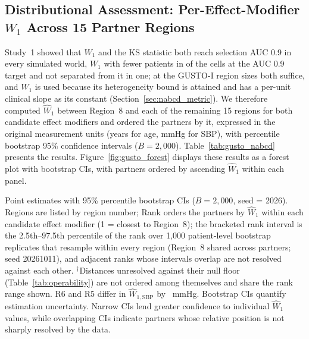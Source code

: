 \documentclass[AMA,Times1COL]{WileyNJDv5}
\begin{document}
\subsection{Distributional Assessment: Per-Effect-Modifier $W_1$ Across 15 Partner Regions}\label{sec:app_nabcd}

Study~1 showed that $W_1$ and the KS statistic both reach selection AUC 0.9 in every simulated world, $W_1$ with fewer patients in  of the  cells at the AUC 0.9 target and not separated from it in one; at the GUSTO-I region sizes both suffice, and $W_1$ is used because its heterogeneity bound is attained and has a per-unit clinical slope as its constant (Section~\ref{sec:nabcd_metric}). We therefore computed $\widehat{W}_1$ between Region~8 and each of the remaining 15 regions for both candidate effect modifiers and ordered the partners by it, expressed in the original measurement units (years for age, mmHg for SBP), with percentile bootstrap 95\% confidence intervals ($B = 2{,}000$). Table~\ref{tab:gusto_nabcd} presents the results. Figure~\ref{fig:gusto_forest} displays these results as a forest plot with bootstrap CIs, with partners ordered by ascending $\widehat{W}_1$ within each panel.

\begin{table}[ht]
\centering
\caption{Per-effect-modifier Wasserstein-1 distance $\widehat{W}_1$ in original variable units (years for age, mmHg for SBP) with 95\% percentile bootstrap CIs for Region~8 versus each partner region (GUSTO-I), listed by region number, with each partner's rank by $\widehat{W}_1$ within each candidate effect modifier.\label{tab:gusto_nabcd}}
\begin{tablenotes}
\item Point estimates with 95\% percentile bootstrap CIs ($B = 2{,}000$, seed = 2026). Regions are listed by region number; Rank orders the partners by $\widehat{W}_1$ within each candidate effect modifier (1 = closest to Region~8); the bracketed rank interval is the 2.5th--97.5th percentile of the rank over 1{,}000 patient-level bootstrap replicates that resample within every region (Region~8 shared across partners; seed 20261011), and adjacent ranks whose intervals overlap are not resolved against each other. $^\dagger$Distances unresolved against their null floor (Table~\ref{tab:operability}) are not ordered among themselves and share the rank range shown. R6 and R5 differ in $\widehat{W}_{1,\text{SBP}}$ by ~mmHg. Bootstrap CIs quantify estimation uncertainty. Narrow CIs lend greater confidence to individual $\widehat{W}_1$ values, while overlapping CIs indicate partners whose relative position is not sharply resolved by the data.
\end{tablenotes}
\end{table}
\end{document}
